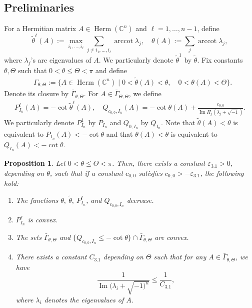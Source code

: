 \documentclass{amsart}
\numberwithin{equation}{section}
\theoremstyle{plain}
\newtheorem{prop}[equation]{Proposition}
\theoremstyle{definition}
\theoremstyle{remark}
\begin{document}
\subsection{Preliminaries}
For a Hermitian matrix $A\in\operatorname{Herm}(\mathbb{C}^n)$ and $\ell=1,\dots,{n-1}$, define
\begin{equation}\label{eq:thetaop}
    \tilde{\theta}^\ell(A):=\max_{i_1,\dots,i_\ell}\sum_{j\neq i_1,\dots,i_\ell} \operatorname{arccot}\lambda_j,\quad \theta(A):=\sum_j\operatorname{arccot}\lambda_j,
\end{equation}
where $\lambda_j$'s are eigenvalues of $A$. We particularly denote $\tilde{\theta}^1$ by $\tilde{\theta}.$
Fix constants $\theta,\Theta$ such that $0<\theta\le\Theta<\pi$ and define
\begin{equation}\label{eq:thetaset}
    \begin{aligned}
        &{\Gamma}_{\theta,\Theta}:=\{A\in\operatorname{Herm}(\mathbb{C}^n)\mid 0<\tilde{\theta}(A)<\theta,\quad 0<\theta(A)<\Theta\}.    \end{aligned}
\end{equation}
Denote its closure by $\bar{\Gamma}_{\theta,\Theta}$.
For $A\in\bar{\Gamma}_{\Theta,\Theta}$, we define
\begin{align*}
    P^\ell_{I_n}(A)= - \cot\tilde{\theta}^\ell(A),\quad Q_{c_{0,0},I_n}(A) = -\cot\theta(A)+\frac{c_{0,0}}{\operatorname{Im}\Pi_j(\lambda_j+\sqrt{-1})}.
\end{align*}
We particularly denote $P^1_{I_n}$ by $P_{I_n}$ and $Q_{0,I_n}$ by $Q_{I_n}$. Note that $\tilde{\theta}(A)<\theta$ is equivalent to
$P_{I_n}(A)<-\cot\theta$ and that $\theta(A)<\theta$ is equivalent to $Q_{I_n}(A)<-\cot\theta.$

\begin{prop}\label{prop:dhymproperties}
    Let $0<\theta\le\Theta<\pi$. Then, there exists a constant $\varepsilon_{3.1}>0$, depending on $\theta$, such that if a constant $c_{0,0}$ satisfies $c_{0,0}>-\varepsilon_{3.1}$, the following hold: 
    \begin{enumerate}[label={\upshape(\roman*)}]
        \item\label{item:dhymmonotonicity} The functions $\theta, \ \tilde{\theta},\ P^\ell_{I_n}$, and $Q_{c_{0,0},I_n}$ decrease.
        \item\label{item:dhympconv} $P^\ell_{I_n}$ is convex. 
        \item\label{item:dhymsublevel} The sets $\bar{\Gamma}_{\theta,\Theta}$ and $\{Q_{c_{0,0},I_n}\le -\cot\theta\}\cap\bar{\Gamma}_{\theta,\Theta}$ are convex.
        \item\label{item:dhymImest} There exists a constant $C_{3.1}$ depending on $\Theta$ such that for any $A\in\bar{\Gamma}_{\theta,\Theta}$, we have
        $$\frac{1}{\operatorname{Im}(\lambda_i+\sqrt{-1)^n}}\le\frac{1}{C_{3.1}},$$
        where $\lambda_i$ denotes the eigenvalues of $A$.
    \end{enumerate}
\end{prop}
\end{document}
